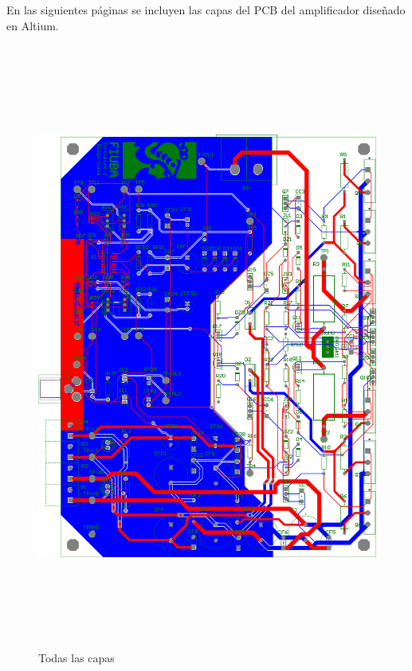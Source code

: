 En las siguientes páginas se incluyen las capas del PCB del amplificador diseñado en Altium.

\clearpage

\begin{figure}[H]
    \centering
    \includegraphics[height=200mm, angle=0]{img/PCB/layers/amplifier/all-2D.png}
    \caption{\footnotesize{Todas las capas}}
    \label{fig:pcb_amp_all}
\end{figure}

\clearpage

